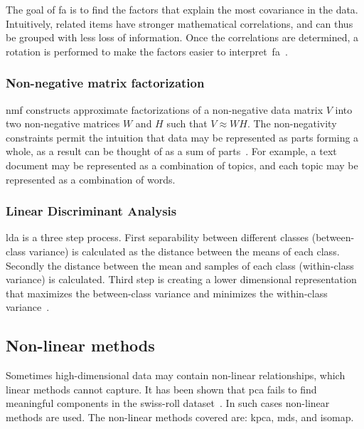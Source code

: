 The goal of \gls{fa} is to find the factors that explain the most covariance in the data. Intuitively, related items have stronger mathematical correlations, and can thus be grouped with less loss of information. Once the correlations are determined, a rotation is performed to make the factors easier to interpret~\gls{fa}~\cite{decoster-1998-factor-analysis-overview}.


\subsubsection{Non-negative matrix factorization}\label{subsubsec:non-negative-matrix-factorization}
\gls{nmf} constructs approximate factorizations of a non-negative data matrix $V$ into two non-negative matrices $W$ and $H$ such that $V \approx WH$. The non-negativity constraints permit the intuition that data may be represented as parts forming a whole, as a result can be thought of as a sum of parts~\cite{lee-1999-learning-nmf}. For example, a text document may be represented as a combination of topics, and each topic may be represented as a combination of words.


\subsubsection{Linear Discriminant Analysis}\label{subsubsec:linear-discriminant-analysis}
\gls{lda} is a three step process. First separability between different classes (between-class variance) is calculated as the distance between the means of each class. Secondly the distance between the mean and samples of each class (within-class variance) is calculated. Third step is creating a lower dimensional representation that maximizes the between-class variance and minimizes the within-class variance~\cite{linear-discriminant-analysis-tutorial}.


\subsection{Non-linear methods}\label{subsec:non-linear-methods}
Sometimes high-dimensional data may contain non-linear relationships, which linear methods cannot capture. It has been shown that \gls{pca} fails to find meaningful components in the swiss-roll dataset~\cite{tennenbaum}. In such cases non-linear methods are used. The non-linear methods covered are: \gls{kpca}, \gls{mds}, and \gls{isomap}.







